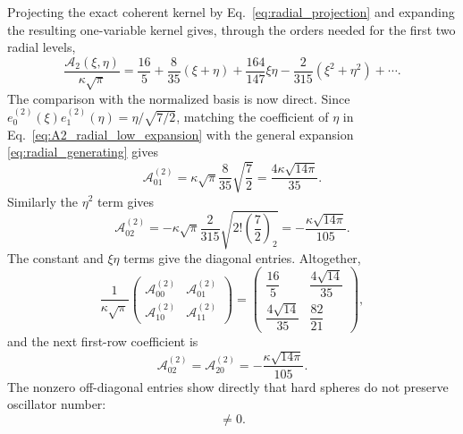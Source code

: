 \documentclass[11pt]{article}
\numberwithin{equation}{section}
\theoremstyle{definition}
\begin{document}
Projecting the exact coherent kernel by Eq.~\eqref{eq:radial_projection} and
expanding the resulting one-variable kernel gives, through the orders needed
for the first two radial levels,
\begin{equation}
 \frac{\mathscr A_2(\xi,\eta)}{\kappa\sqrt\pi}
 =\frac{16}{5}
 +\frac{8}{35}(\xi+\eta)
 +\frac{164}{147}\xi\eta
 -\frac{2}{315}(\xi^2+\eta^2)
 +\cdots .
 \label{eq:A2_radial_low_expansion}
\end{equation}
The comparison with the normalized basis is now direct.  Since
$e_0^{(2)}(\xi)e_1^{(2)}(\eta)=\eta/\sqrt{7/2}$, matching the coefficient of
$\eta$ in Eq.~\eqref{eq:A2_radial_low_expansion} with the general expansion
\eqref{eq:radial_generating} gives
\begin{equation}
 \mathcal A^{(2)}_{01}
 =\kappa\sqrt\pi\frac{8}{35}\sqrt{\frac72}
 =\frac{4\kappa\sqrt{14\pi}}{35}.
\end{equation}
Similarly the $\eta^2$ term gives
\begin{equation}
 \mathcal A^{(2)}_{02}
 =-\kappa\sqrt\pi\frac{2}{315}
 \sqrt{2!\left(\frac72\right)_2}
 =-\frac{\kappa\sqrt{14\pi}}{105}.
\end{equation}
The constant and $\xi\eta$ terms give the diagonal entries.  Altogether,
\begin{equation}
 \boxed{
 \frac{1}{\kappa\sqrt\pi}
 \begin{pmatrix}
 \mathcal A^{(2)}_{00}&\mathcal A^{(2)}_{01}\\
 \mathcal A^{(2)}_{10}&\mathcal A^{(2)}_{11}
 \end{pmatrix}
 =
 \begin{pmatrix}
 \dfrac{16}{5}&\dfrac{4\sqrt{14}}{35}\\[2mm]
 \dfrac{4\sqrt{14}}{35}&\dfrac{82}{21}
 \end{pmatrix},
 }
 \label{eq:l2_two_state_block}
\end{equation}
and the next first-row coefficient is
\begin{equation}
 \mathcal A^{(2)}_{02}
 =\mathcal A^{(2)}_{20}
 =-\frac{\kappa\sqrt{14\pi}}{105}.
 \label{eq:A202}
\end{equation}
The nonzero off-diagonal entries show directly that hard spheres do not
preserve oscillator number:
\begin{equation}
 [\widehat N,\widehat{\mathcal A}_{\rm HS}]\ne0.
\end{equation}
\end{document}
